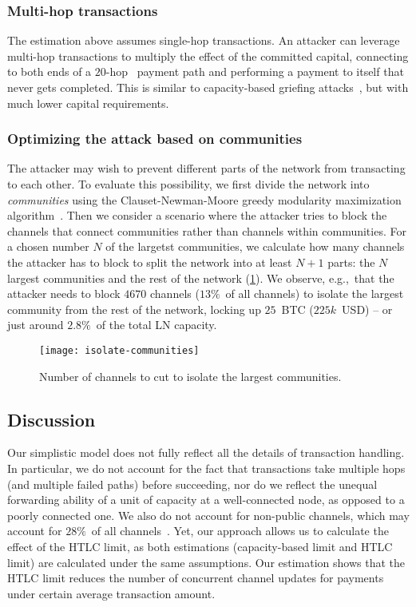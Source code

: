 \subsubsection*{Multi-hop transactions}
The estimation above assumes single-hop transactions.
An attacker can leverage multi-hop transactions to multiply the effect of the committed capital,
connecting to both ends of a $20$-hop~\cite{Bolt4OnionRouting} payment path and performing a payment 
to itself that never gets completed. 
This is similar to capacity-based griefing attacks~\cite{HerreraJoancomarti2019}, 
but with much lower capital requirements.

\subsubsection*{Optimizing the attack based on communities}
The attacker may wish to prevent different parts of the network from transacting to each other.
To evaluate this possibility, we first divide the network into \textit{communities} using the Clauset-Newman-Moore greedy modularity maximization algorithm~\cite{Clauset2004}.
Then we consider a scenario where the attacker tries to block the channels that connect communities 
rather than channels within communities.
For a chosen number $N$ of the largetst communities, we calculate how many channels the attacker has to block to split the network into at least $N+1$ parts: the $N$ largest communities and the rest of the network (\cref{fig:isolate-communities}).
We observe, e.g.,~that the attacker needs to block $4670$ channels 
($13\%$~of all channels) to isolate the largest community from the rest of the network, locking up $25$~BTC ($225k$~USD) -- or just around $2.8\%$~of the total LN capacity.

\begin{figure}[tb]
	\centering
	\texttt{[image: isolate-communities]}
	\caption{Number of channels to cut to isolate the largest communities.\label{fig:isolate-communities}}
\end{figure}



\subsection{Discussion}
Our simplistic model does not fully reflect all the details of transaction handling. 
In particular, we do not account for the fact that transactions take multiple hops (and multiple failed paths) before succeeding, nor do we reflect the unequal forwarding ability of a unit of capacity at a well-connected node, 
as opposed to a poorly connected one.
We also do not account for non-public channels, which may account for $28\%$~of all channels~\cite{BitMEXPrivateChannels}.
Yet, our approach allows us to calculate the effect of the HTLC limit,
as both estimations (capacity-based limit and HTLC limit) are calculated under the same assumptions.
Our estimation shows that the HTLC limit reduces the number of concurrent channel updates 
for payments under certain average transaction amount. 

